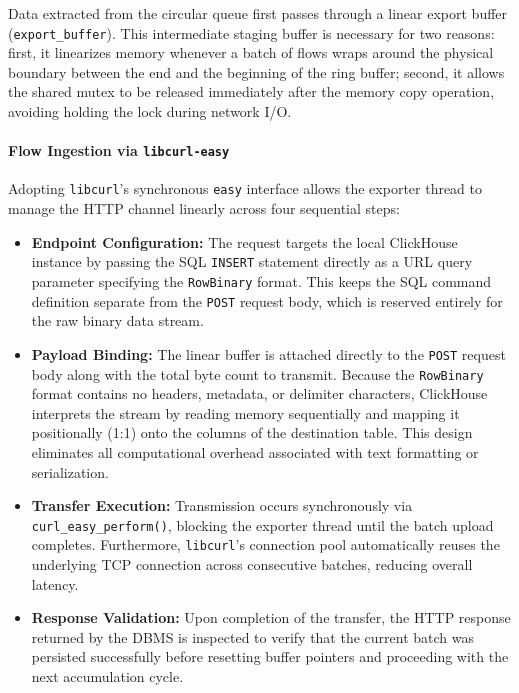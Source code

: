 \documentclass[11pt,a4paper]{article}
\begin{document}
Data extracted from the circular queue first passes through a linear export buffer (\texttt{export\_buffer}). This intermediate staging buffer is necessary for two reasons: first, it linearizes memory whenever a batch of flows wraps around the physical boundary between the end and the beginning of the ring buffer; second, it allows the shared mutex to be released immediately after the memory copy operation, avoiding holding the lock during network I/O.

\paragraph{Flow Ingestion via \texttt{libcurl-easy}}
Adopting \texttt{libcurl}'s synchronous \texttt{easy} interface allows the exporter thread to manage the HTTP channel linearly across four sequential steps:
\begin{itemize}
    \item \textbf{Endpoint Configuration:} The request targets the local ClickHouse instance by passing the SQL \texttt{INSERT} statement directly as a URL query parameter specifying the \texttt{RowBinary} format. This keeps the SQL command definition separate from the \texttt{POST} request body, which is reserved entirely for the raw binary data stream.
    \item \textbf{Payload Binding:} The linear buffer is attached directly to the \texttt{POST} request body along with the total byte count to transmit. Because the \texttt{RowBinary} format contains no headers, metadata, or delimiter characters, ClickHouse interprets the stream by reading memory sequentially and mapping it positionally (1:1) onto the columns of the destination table. This design eliminates all computational overhead associated with text formatting or serialization.
    \item \textbf{Transfer Execution:} Transmission occurs synchronously via \texttt{curl\_easy\_perform()}, blocking the exporter thread until the batch upload completes. Furthermore, \texttt{libcurl}'s connection pool automatically reuses the underlying TCP connection across consecutive batches, reducing overall latency.
    \item \textbf{Response Validation:} Upon completion of the transfer, the HTTP response returned by the DBMS is inspected to verify that the current batch was persisted successfully before resetting buffer pointers and proceeding with the next accumulation cycle.
\end{itemize}
\end{document}
